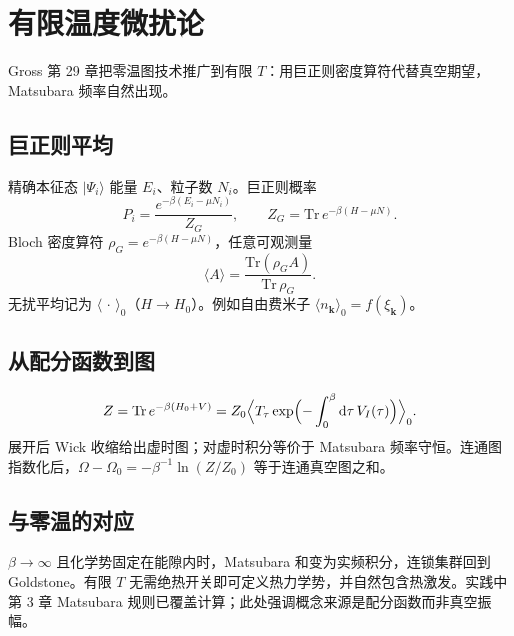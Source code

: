 \section{有限温度微扰论}

Gross 第 29 章把零温图技术推广到有限 $T$：用巨正则密度算符代替真空期望，Matsubara 频率自然出现。

\subsection{巨正则平均}

精确本征态 $|\Psi_i\rangle$ 能量 $E_i$、粒子数 $N_i$。巨正则概率
\begin{equation}
  P_i
  =\frac{e^{-\beta(E_i-\mu N_i)}}{Z_G},
  \qquad
  Z_G
  =\mathrm{Tr}\,e^{-\beta(H-\mu N)}.
\end{equation}
Bloch 密度算符 $\rho_G=e^{-\beta(H-\mu N)}$，任意可观测量
\begin{equation}
  \langle A\rangle
  =\frac{\mathrm{Tr}(\rho_G A)}{\mathrm{Tr}\,\rho_G}.
\end{equation}
无扰平均记为 $\langle\,\cdot\,\rangle_0$（$H\to H_0$）。例如自由费米子 $\langle n_{\mathbf{k}}\rangle_0=f(\xi_{\mathbf{k}})$。

\subsection{从配分函数到图}

\begin{equation}
  Z
  =\mathrm{Tr}\,e^{-\beta(H_0+V)}
  =Z_0
  \Bigl\langle
  T_\tau\exp\Bigl(
  -\int_0^\beta\mathrm{d}\tau\,V_I(\tau)
  \Bigr)
  \Bigr\rangle_0.
\end{equation}
展开后 Wick 收缩给出虚时图；对虚时积分等价于 Matsubara 频率守恒。连通图指数化后，$\Omega-\Omega_0=-\beta^{-1}\ln(Z/Z_0)$ 等于连通真空图之和。

\subsection{与零温的对应}

$\beta\to\infty$ 且化学势固定在能隙内时，Matsubara 和变为实频积分，连锁集群回到 Goldstone。有限 $T$ 无需绝热开关即可定义热力学势，并自然包含热激发。实践中第 3 章 Matsubara 规则已覆盖计算；此处强调概念来源是配分函数而非真空振幅。
